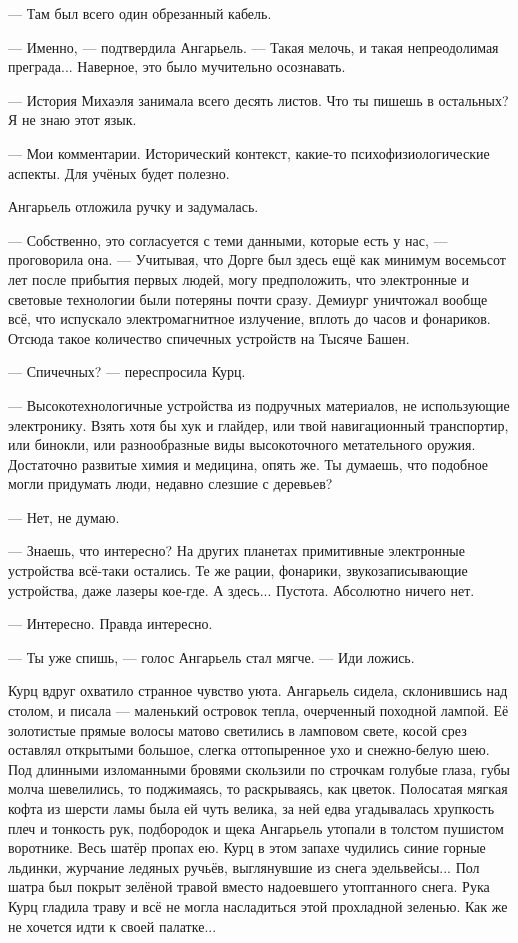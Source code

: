--- Там был всего один обрезанный кабель.

--- Именно, --- подтвердила Ангарьель.
--- Такая мелочь, и такая непреодолимая преграда...
Наверное, это было мучительно осознавать.

--- История Михаэля занимала всего десять листов.
Что ты пишешь в остальных?
Я не знаю этот язык.

--- Мои комментарии.
Исторический контекст, какие-то психофизиологические аспекты.
Для учёных будет полезно.

Ангарьель отложила ручку и задумалась.

--- Собственно, это согласуется с теми данными, которые есть у нас, --- проговорила она.
--- Учитывая, что Дорге был здесь ещё как минимум восемьсот лет после прибытия первых людей, могу предположить, что электронные и световые технологии были потеряны почти сразу.
Демиург уничтожал вообще всё, что испускало электромагнитное излучение, вплоть до часов и фонариков.
Отсюда такое количество спичечных устройств на Тысяче Башен.

--- Спичечных? --- переспросила Курц.

--- Высокотехнологичные устройства из подручных материалов, не использующие электронику.
Взять хотя бы хук и глайдер, или твой навигационный транспортир, или бинокли, или разнообразные виды высокоточного метательного оружия.
Достаточно развитые химия и медицина, опять же.
Ты думаешь, что подобное могли придумать люди, недавно слезшие с деревьев?

--- Нет, не думаю.

--- Знаешь, что интересно?
На других планетах примитивные электронные устройства всё-таки остались.
Те же рации, фонарики, звукозаписывающие устройства, даже лазеры кое-где.
А здесь...
Пустота.
Абсолютно ничего нет.

--- Интересно.
Правда интересно.

--- Ты уже спишь, --- голос Ангарьель стал мягче.
--- Иди ложись.

Курц вдруг охватило странное чувство уюта.
Ангарьель сидела, склонившись над столом, и писала --- маленький островок тепла, очерченный походной лампой.
Её золотистые прямые волосы матово светились в ламповом свете, косой срез оставлял открытыми большое, слегка оттопыренное ухо и снежно-белую шею.
Под длинными изломанными  бровями скользили по строчкам голубые глаза, губы молча шевелились, то поджимаясь, то раскрываясь, как цветок.
Полосатая мягкая кофта из шерсти ламы была ей чуть велика, за ней едва угадывалась хрупкость плеч и тонкость рук, подбородок и щека Ангарьель утопали в толстом пушистом воротнике.
Весь шатёр пропах ею.
Курц в этом запахе чудились синие горные льдинки, журчание ледяных ручьёв, выглянувшие из снега эдельвейсы...
Пол шатра был покрыт зелёной травой вместо надоевшего утоптанного снега.
Рука Курц гладила траву и всё не могла насладиться этой прохладной зеленью.
Как же не хочется идти к своей палатке...

